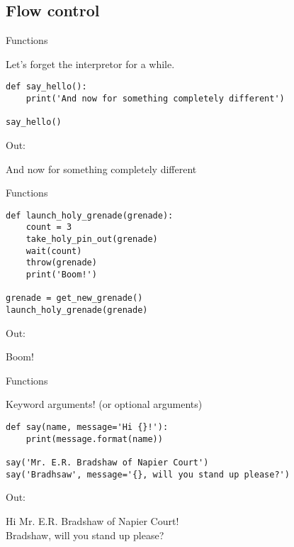 \documentclass[ignorenonframetext,]{beamer}
\begin{document}
\subsection{Flow control}

\begin{frame}[fragile]{Functions}

    Let's forget the interpretor for a while.

    \begin{tcolorbox}
    \begin{verbatim}
def say_hello():
    print('And now for something completely different')

say_hello()
    \end{verbatim}
    \end{tcolorbox}

Out:
    \begin{tcolorbox}
And now for something completely different
    \end{tcolorbox}
\end{frame}

\begin{frame}[fragile]{Functions}

    \begin{tcolorbox}
    \begin{verbatim}
def launch_holy_grenade(grenade):
    count = 3
    take_holy_pin_out(grenade)
    wait(count)
    throw(grenade)
    print('Boom!')

grenade = get_new_grenade()
launch_holy_grenade(grenade)
    \end{verbatim}
    \end{tcolorbox}

Out:
    \begin{tcolorbox}
Boom!
    \end{tcolorbox}
\end{frame}

\begin{frame}[fragile]{Functions}

    Keyword arguments! (or optional arguments)

    \begin{tcolorbox}
    \begin{verbatim}
def say(name, message='Hi {}!'):
    print(message.format(name))

say('Mr. E.R. Bradshaw of Napier Court')
say('Bradhsaw', message='{}, will you stand up please?')
    \end{verbatim}
    \end{tcolorbox}

Out:
    \begin{tcolorbox}
Hi Mr. E.R. Bradshaw of Napier Court!\\
Bradshaw, will you stand up please?
    \end{tcolorbox}
\end{frame}
\end{document}
